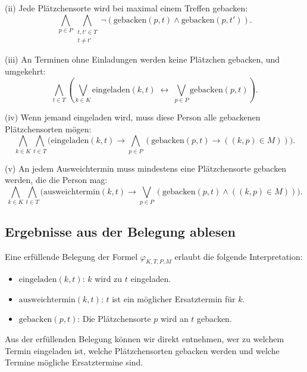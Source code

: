\documentclass[12pt,a4paper]{article}
\begin{document}
(ii) Jede Plätzchensorte wird bei maximal einem Treffen gebacken:
\[
\bigwedge_{p \in P}\bigwedge_{\substack{t,t' \in T \\ t \neq t'}} \neg(\text{gebacken}(p,t) \wedge \text{gebacken}(p,t')).
\]

(iii) An Terminen ohne Einladungen werden keine Plätzchen gebacken, und umgekehrt:
\[
\bigwedge_{t \in T} \left( \bigvee_{k \in K}\text{eingeladen}(k,t) \;\leftrightarrow\; \bigvee_{p \in P}\text{gebacken}(p,t) \right).
\]

(iv) Wenn jemand eingeladen wird, muss diese Person alle gebackenen Plätzchensorten mögen:
\[
\bigwedge_{k \in K}\bigwedge_{t \in T}\bigl(\text{eingeladen}(k,t) \to \bigwedge_{p \in P}(\text{gebacken}(p,t) \to ((k,p)\in M))\bigr).
\]

(v) An jedem Ausweichtermin muss mindestens eine Plätzchensorte gebacken werden, die die Person mag:
\[
\bigwedge_{k \in K}\bigwedge_{t \in T}\bigl(\text{ausweichtermin}(k,t) \to \bigvee_{p \in P}(\text{gebacken}(p,t)\wedge((k,p)\in M))\bigr).
\]

\subsection*{Ergebnisse aus der Belegung ablesen}

Eine erfüllende Belegung der Formel $\varphi_{K,T,P,M}$ erlaubt die folgende Interpretation:
\begin{itemize}
    \item $\text{eingeladen}(k,t)$: $k$ wird zu $t$ eingeladen.
    \item $\text{ausweichtermin}(k,t)$: $t$ ist ein möglicher Ersatztermin für $k$.
    \item $\text{gebacken}(p,t)$: Die Plätzchensorte $p$ wird an $t$ gebacken.
\end{itemize}

Aus der erfüllenden Belegung können wir direkt entnehmen, wer zu welchem Termin eingeladen ist, welche Plätzchensorten gebacken werden und welche Termine mögliche Ersatztermine sind.
\end{document}
